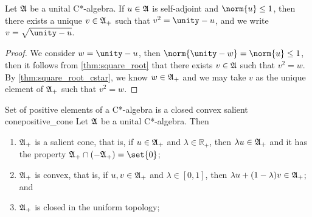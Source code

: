 \begin{corollary}
    Let \(\mathfrak{A}\) be a unital C*-algebra. If \(u \in \mathfrak{A}\) is self-adjoint and \(\norm{u} \leq 1\), then there exists a unique \(v \in \mathfrak{A}_+\) such that \(v^2 = \unity - u\), and we write \(v = \sqrt{\unity - u}\).
\end{corollary}
\begin{proof}
    We consider \(w = \unity - u\), then \(\norm{\unity - w} = \norm{u} \leq 1\), then it follows from \cref{thm:square_root} that there exists \(v \in \mathfrak{A}\) such that \(v^2 = w\). By \cref{thm:square_root_cstar}, we know \(w \in \mathfrak{A}_+\) and we may take \(v\) as the unique element of \(\mathfrak{A}_+\) such that \(v^2 = w\).
\end{proof}

\begin{theorem}{Set of positive elements of a C*-algebra is a closed convex salient cone}{positive_cone}
    Let \(\mathfrak{A}\) be a unital C*-algebra. Then
    \begin{enumerate}[label=(\alph*)]
        \item \(\mathfrak{A}_+\) is a salient cone, that is, if \(u \in \mathfrak{A}_+\) and \(\lambda \in \mathbb{R}_+\), then \(\lambda u \in \mathfrak{A}_+\) and it has the property \(\algebra{A}_+ \cap (-\algebra{A}_+) = \set{0}\);
        \item \(\mathfrak{A}_+\) is convex, that is, if \(u, v \in \mathfrak{A}_+\) and \(\lambda \in [0,1]\), then \(\lambda u + (1 - \lambda)v \in \mathfrak{A}_+\); and
        \item \(\mathfrak{A}_+\) is closed in the uniform topology;
    \end{enumerate}
\end{theorem}
